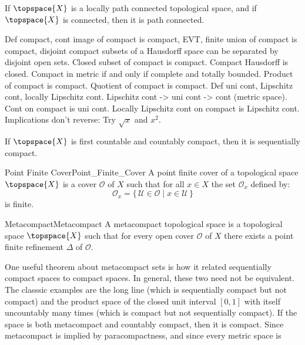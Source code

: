     \begin{theorem}
        If $\topspace{X}$ is a locally path connected topological space,
        and if $\topspace{X}$ is connected, then it is path connected.
    \end{theorem}
    Def compact, cont image of compact is compact, EVT, finite union of
    compact is compact, disjoint compact subsets of a Hausdorff space can be
    separated by disjoint open sets. Closed subset of compact is compact.
    Compact Hausdorff is closed. Compact in metric if and only if complete
    and totally bounded. Product of compact is compact. Quotient of compact
    is compact. Def uni cont, Lipschitz cont, locally Lipschitz cont.
    Lipschitz cont -> uni cont -> cont (metric space). Cont on compact is
    uni cont. Locally Lipschitz cont on compact is Lipschitz cont.
    Implications don't reverse: Try $\sqrt{x}$ and $x^{2}$.
    \begin{theorem}
        If $\topspace{X}$ is first countable and countably compact,
        then it is sequentially compact.
    \end{theorem}
    \begin{fdefinition}{Point Finite Cover}{Point_Finite_Cover}
        A point finite cover of a topological space $\topspace{X}$ is a
        cover $\mathcal{O}$ of $X$ such that for all $x\in{X}$ the set
        $\mathcal{O}_{x}$ defined by:
        \begin{equation*}
            \mathcal{O}_{x}=\{\,\mathcal{U}\in\mathcal{O}\;|\;
                x\in\mathcal{U}\,\}
        \end{equation*}
        is finite.
    \end{fdefinition}
    \begin{fdefinition}{Metacompact}{Metacompact}
        A metacompact topological space is a topological space
        $\topspace{X}$ such that for every open cover $\mathcal{O}$ of $X$
        there exists a point finite refinement $\Delta$ of $\mathcal{O}$.
    \end{fdefinition}
    One useful theorem about metacompact sets is how it related sequentially
    compact spaces to compact spaces. In general, these two need not be
    equivalent. The classsic examples are the long line (which is
    sequentially compact but not compact) and the product space of the
    closed unit interval $[0,1]$ with itself uncountably many times
    (which is compact but not sequentially compact). If the space is both
    metacompact and countably compact, then it is compact. Since metacompact
    is implied by paracompactness, and since every metric space is
